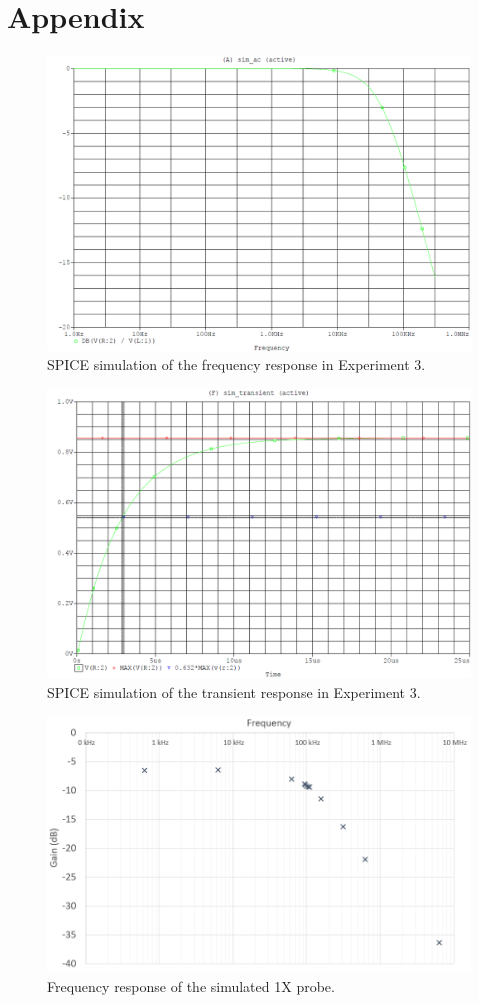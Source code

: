 \documentclass{report}
\begin{document}
\pagebreak

\section*{Appendix}
\vspace{-2em}
\begin{figure}[h]
	\centering
	\includegraphics[width=0.65\linewidth]{rlsim}
	\caption{SPICE simulation of the frequency response in Experiment 3.}
	\label{fig:rlsim}
\end{figure}
\begin{figure}[h]
	\centering
	\includegraphics[width=0.65\linewidth]{rlsimtrans}
	\caption{SPICE simulation of the transient response in Experiment 3.}
	\label{fig:rlsimtrans}
\end{figure}
\begin{figure}[h]
	\centering
	\includegraphics[width=0.7\linewidth]{exp4c1x}
	\caption{Frequency response of the simulated 1X probe.}
	\label{fig:exp4c1x}
\end{figure}
\end{document}

